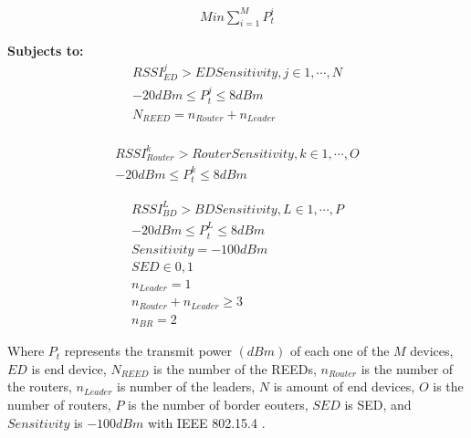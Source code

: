 \begin{equation}\label{eq:minimize_power}
    \begin{aligned}
        Min\sum_{i=1}^{M}P_t^i
    \end{aligned}
\end{equation}

\textbf{Subjects to:}
\begin{equation}\label{eq:mathematical_constraints_end_device}
    \begin{split}
        RSSI_{ED}^j>EDSensitivity,j\in1,\cdots,N \\
        -20dBm{\le P}_t^j\le8dBm \\
        N_{REED}=n_{Router}+n_{Leader} \\
    \end{split}
\end{equation}

\begin{equation}\label{eq:mathematical_constraints_router}
    \begin{split}
        {RSSI}_{Router}^k>RouterSensitivity,k\in1,\cdots,O \\
        -{20dBm\le P}_t^k\le8dBm
    \end{split}
\end{equation}

\begin{equation}\label{eq:mathematical_constraints_border_router}
    \begin{split}
        {RSSI}_{BD}^L>BDSensitivity,L\in1,\cdots,P \\
        -{20dBm\le P}_t^L\le8dBm \\
        Sensitivity=-100dBm \\
        SED\in0,1 \\
        n_{Leader}=1 \\
        n_{Router}+n_{Leader}\geq3 \\
        n_{BR}=2
    \end{split}
\end{equation}

Where $P_t$ represents the transmit power $(dBm)$ of each one of the $M$ devices, $ED$ is end device, $N_{REED}$ is the number of the \glspl{REED}, $n_{Router}$ is the number of the routers, $n_{Leader}$ is number of the leaders, $N$ is amount of end devices, $O$ is the number of routers, $P$ is the number of border eouters, $SED$ is \acrlong{SED}, and $Sensitivity$ is $-100 dBm$ with \gls{IEEE} 802.15.4 \cite{Semiconductor_Nordic_Product_Brief_2018_2.0}.

